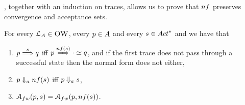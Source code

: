 

, together with an induction on traces, allows
us to prove that $\chopSym$ preserves convergence and acceptance sets.

\begin{lemma}
  \label{lem:normalisation-preserves-predicates}
  For every $\mathcal{L}_A \in \textsc{OW}$, every $p \in A$ and
  every $\trace \in \Actfin$ and  we have that
  \begin{enumerate}
  \item %
    $ p \mathrel{\overset{ s } \Longrightarrow} q$ iff $ p \wt{ \chop{\trace} } \cdot \simeq q$,
    and if the first trace does not pass through a successful state then the normal form does not either,
  \item %
    $ p \acnvalong{\chop{\trace} }$ iff $ p \Downarrow_{a}{ s }$,
  \item %
    $ \accht{p}{ \trace } = \accht{p}{ \chop{\trace} }$.
  \end{enumerate}
\end{lemma}
\noindent

